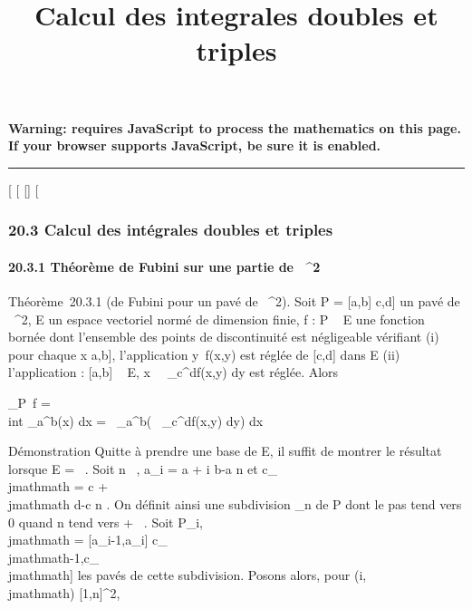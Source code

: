 \documentclass[]{article}
\title{Calcul des integrales doubles et triples}
\author{}
\date{}
\begin{document}
\maketitle

\textbf{Warning: 
requires JavaScript to process the mathematics on this page.\\ If your
browser supports JavaScript, be sure it is enabled.}

\begin{center}\rule{3in}{0.4pt}\end{center}

{[}
{[}
{[}{]}
{[}

\subsubsection{20.3 Calcul des intégrales doubles et triples}

\paragraph{20.3.1 Théorème de Fubini sur une partie de ~^2}

Théorème~20.3.1 (de Fubini pour un pavé de ~^2). Soit P =
{[}a,b{]} \times {[}c,d{]} un pavé de ~^2, E un espace vectoriel
normé de dimension finie, f : P \rightarrow~ E une fonction bornée dont l'ensemble
des points de discontinuité est négligeable vérifiant (i) pour chaque x
\in {[}a,b{]}, l'application y\mapsto~f(x,y) est
réglée de {[}c,d{]} dans E (ii) l'application \phi : {[}a,b{]} \rightarrow~ E,
x\mapsto~\int ~
_c^df(x,y) dy est réglée. Alors

\int  _P~f =\\int
 _a^b\phi(x) dx =\int ~
_a^b\left (\int ~
_c^df(x,y) dy\right ) dx

Démonstration Quitte à prendre une base de E, il suffit de montrer le
résultat lorsque E = ~. Soit n \in {}~, a_i = a + i b-a
\over n et c_\\jmathmath = c + \\jmathmath d-c
\over n . On définit ainsi une subdivision \sigma_n
de P dont le pas tend vers 0 quand n tend vers + \infty~. Soit P_i,\\jmathmath
= {[}a_i-1,a_i{]} \times {[}c_\\jmathmath-1,c_\\jmathmath{]}
les pavés de cette subdivision. Posons alors, pour (i,\\jmathmath) \in
{[}1,n{]}^2,
\end{document}

